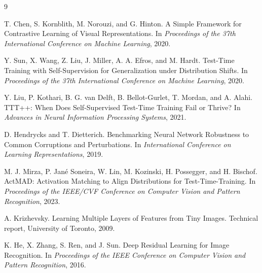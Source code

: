 \documentclass[a4paper,11pt]{article}
\begin{document}
\begin{thebibliography}{9}

T. Chen, S. Kornblith, M. Norouzi, and G. Hinton.
\newblock A Simple Framework for Contrastive Learning of Visual Representations.
\newblock In \emph{Proceedings of the 37th International Conference on Machine Learning}, 2020.

Y. Sun, X. Wang, Z. Liu, J. Miller, A. A. Efros, and M. Hardt.
\newblock Test-Time Training with Self-Supervision for Generalization under Distribution Shifts.
\newblock In \emph{Proceedings of the 37th International Conference on Machine Learning}, 2020.

Y. Liu, P. Kothari, B. G. van Delft, B. Bellot-Gurlet, T. Mordan, and A. Alahi.
\newblock TTT++: When Does Self-Supervised Test-Time Training Fail or Thrive?
\newblock In \emph{Advances in Neural Information Processing Systems}, 2021.

D. Hendrycks and T. Dietterich.
\newblock Benchmarking Neural Network Robustness to Common Corruptions and Perturbations.
\newblock In \emph{International Conference on Learning Representations}, 2019.

M. J. Mirza, P. Jan\'{e} Soneira, W. Lin, M. Kozinski, H. Possegger, and H. Bischof.
\newblock ActMAD: Activation Matching to Align Distributions for Test-Time-Training.
\newblock In \emph{Proceedings of the IEEE/CVF Conference on Computer Vision and Pattern Recognition}, 2023.

A. Krizhevsky.
\newblock Learning Multiple Layers of Features from Tiny Images.
\newblock Technical report, University of Toronto, 2009.

K. He, X. Zhang, S. Ren, and J. Sun.
\newblock Deep Residual Learning for Image Recognition.
\newblock In \emph{Proceedings of the IEEE Conference on Computer Vision and Pattern Recognition}, 2016.

\end{thebibliography}
\end{document}
